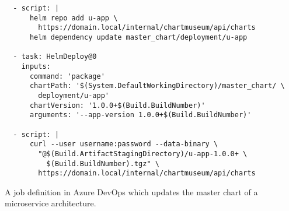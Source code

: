 \begin{longlisting}
\begin{verbatim}
  - script: |
      helm repo add u-app \
        https://domain.local/internal/chartmuseum/api/charts
      helm dependency update master_chart/deployment/u-app

  - task: HelmDeploy@0
    inputs:
      command: 'package'
      chartPath: '$(System.DefaultWorkingDirectory)/master_chart/ \
        deployment/u-app'
      chartVersion: '1.0.0+$(Build.BuildNumber)'
      arguments: '--app-version 1.0.0+$(Build.BuildNumber)'

  - script: |
      curl --user username:password --data-binary \
        "@$(Build.ArtifactStagingDirectory)/u-app-1.0.0+ \
          $(Build.BuildNumber).tgz" \
        https://domain.local/internal/chartmuseum/api/charts
  \end{verbatim}
  \caption{A job definition in Azure DevOps which updates the master chart of a
  microservice architecture.}%
  \label{listing:azure_devops_build_master_chart_job}
\end{longlisting}
